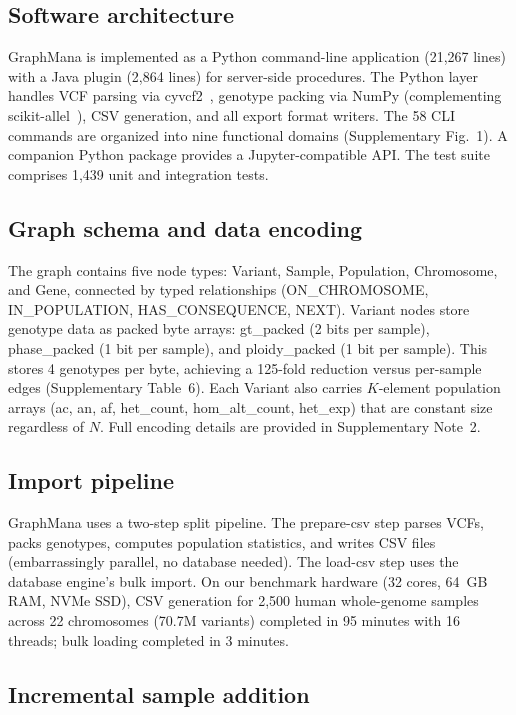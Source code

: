 \documentclass[pdflatex,sn-nature]{sn-jnl}
\begin{document}
\subsection*{Software architecture}

GraphMana is implemented as a Python command-line application (21,267 lines) with a Java plugin (2,864 lines) for server-side procedures. The Python layer handles VCF parsing via cyvcf2~\cite{pedersen2017cyvcf2}, genotype packing via NumPy (complementing scikit-allel~\cite{scikitallel}), CSV generation, and all export format writers. The 58 CLI commands are organized into nine functional domains (Supplementary Fig.~1). A companion Python package provides a Jupyter-compatible API. The test suite comprises 1,439 unit and integration tests.

\subsection*{Graph schema and data encoding}

The graph contains five node types: Variant, Sample, Population, Chromosome, and Gene, connected by typed relationships (ON\_CHROMOSOME, IN\_POPULATION, HAS\_CONSEQUENCE, NEXT). Variant nodes store genotype data as packed byte arrays: gt\_packed (2 bits per sample), phase\_packed (1 bit per sample), and ploidy\_packed (1 bit per sample). This stores 4 genotypes per byte, achieving a 125-fold reduction versus per-sample edges (Supplementary Table~6). Each Variant also carries $K$-element population arrays (ac, an, af, het\_count, hom\_alt\_count, het\_exp) that are constant size regardless of $N$. Full encoding details are provided in Supplementary Note~2.

\subsection*{Import pipeline}

GraphMana uses a two-step split pipeline. The prepare-csv step parses VCFs, packs genotypes, computes population statistics, and writes CSV files (embarrassingly parallel, no database needed). The load-csv step uses the database engine's bulk import. On our benchmark hardware (32 cores, 64~GB RAM, NVMe SSD), CSV generation for 2,500 human whole-genome samples across 22 chromosomes (70.7M variants) completed in 95 minutes with 16 threads; bulk loading completed in 3 minutes.

\subsection*{Incremental sample addition}
\end{document}
